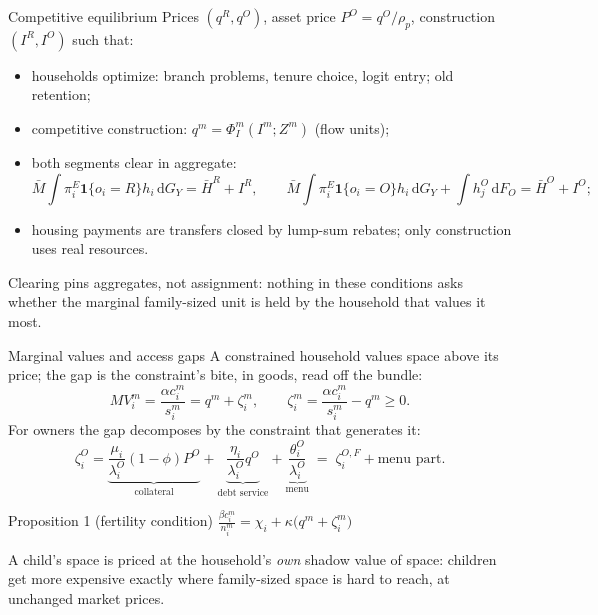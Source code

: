 \documentclass[11pt,aspectratio=169]{beamer}
\newcommand{\dd}{\mathrm d}
\newcommand{\1}{\mathbf 1}
\newcommand{\Mbar}{\bar M}
\begin{document}
\begin{frame}{Competitive equilibrium}
\small
Prices $(q^R,q^O)$, asset price $P^O=q^O/\rho_p$, construction $(I^R,I^O)$ such that:
\begin{itemize}\setlength{\itemsep}{0.3em}
  \item households optimize: branch problems, tenure choice, logit entry; old retention;
  \item competitive construction: $q^m=\Phi_I^m(I^m;Z^m)$ (flow units);
  \item both segments clear in aggregate:
  \[
  \Mbar\!\int\!\pi_i^E\1\{o_i{=}R\}h_i\,\dd G_Y=\bar H^R+I^R,
  \qquad
  \Mbar\!\int\!\pi_i^E\1\{o_i{=}O\}h_i\,\dd G_Y+\!\int\! h_j^O\,\dd F_O=\bar H^O+I^O;
  \]
  \item housing payments are transfers closed by lump-sum rebates; only construction uses real resources.
\end{itemize}
\medskip
Clearing pins aggregates, not assignment: nothing in these conditions asks whether the marginal family-sized unit is held by the household that values it most.
\end{frame}

\begin{frame}{Marginal values and access gaps}
\small
A constrained household values space above its price; the gap is the constraint's bite, in goods, read off the bundle:
\[
MV_i^m=\frac{\alpha c_i^m}{s_i^m}=q^m+\zeta_i^m,
\qquad
\zeta_i^m=\frac{\alpha c_i^m}{s_i^m}-q^m\ge0 .
\]
For owners the gap decomposes by the constraint that generates it:
\[
\zeta_i^O
=
\underbrace{\frac{\mu_i}{\lambda_i^O}(1-\phi)P^O}_{\text{collateral}}
+
\underbrace{\frac{\eta_i}{\lambda_i^O}q^O}_{\text{debt service}}
+
\underbrace{\frac{\theta_i^O}{\lambda_i^O}}_{\text{menu}}
\;=\;
\zeta_i^{O,F}+\text{menu part}.
\]
\begin{block}{Proposition 1 (fertility condition)}
\centering
$\displaystyle \frac{\beta c_i^m}{n_i^m}=\chi_i+\kappa\big(q^m+\zeta_i^m\big)$
\end{block}
\smallskip
A child's space is priced at the household's \emph{own} shadow value of space: children get more expensive exactly where family-sized space is hard to reach, at unchanged market prices.
\end{frame}
\end{document}

